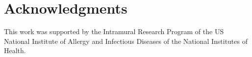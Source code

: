 
\section{Acknowledgments}


This work was supported by the Intramural Research Program of the US National Institute of Allergy and Infectious Diseases of the National Institutes of Health.
